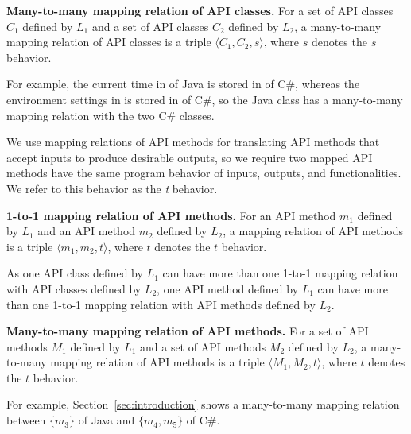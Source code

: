 \textbf{Many-to-many mapping relation of API classes.} For a set of API classes
$C_1$ defined by $L_1$ and a set of API classes $C_2$ defined by
$L_2$, a many-to-many mapping relation of API classes is a triple
$\langle C_1, C_2, s \rangle$, where $s$ denotes the $s$ behavior.

For example, the current time in  of Java
is stored in  of C\#, whereas the
environment settings in  is stored in
 of C\#, so the Java class has a
many-to-many mapping relation with the two C\# classes.

We use mapping relations of API methods for translating API methods
that accept inputs to produce desirable outputs, so we require two
mapped API methods have the same program behavior of inputs, outputs, and
functionalities. We refer to this behavior as the \emph{t} behavior.

\textbf{1-to-1 mapping relation of API methods.} For an API method
$m_1$ defined by $L_1$ and an API method $m_2$ defined by
$L_2$, a mapping relation of API methods is a triple $\langle m_1,
m_2, t \rangle$, where $t$ denotes the $t$ behavior.

As one API class defined by $L_1$ can have more than one 1-to-1 mapping
relation with API classes defined by $L_2$, one API method defined by $L_1$ can have more than one 1-to-1 mapping relation with API methods defined by $L_2$.

\textbf{Many-to-many mapping relation of API methods.} For a set of API methods
$M_1$ defined by $L_1$ and a set of API methods $M_2$ defined by
$L_2$, a many-to-many mapping relation of API methods is a triple
$\langle M_1, M_2, t \rangle$, where $t$ denotes the $t$ behavior.

For example, Section~\ref{sec:introduction} shows a many-to-many mapping relation between $\{m_3\}$ of Java and $\{m_4, m_5\}$ of C\#. 